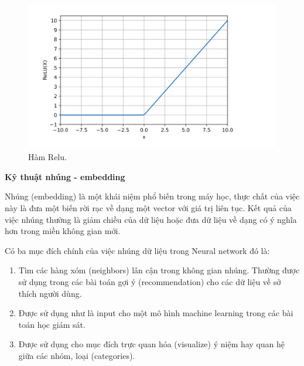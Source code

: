 \begin{itemize}
          \begin{figure}[t]
              \begin{center}
                  \includegraphics[scale=0.2]{asset/image/relu.png}
                  \caption{Hàm Relu. }
                  \label{fig:relu}
              \end{center}
          \end{figure}


\end{itemize}

\textbf{Kỹ thuật nhúng -  embedding}

Nhúng (embedding) là một khái niệm phổ biến trong máy học, thực chất của việc này là đưa một biến rời rạc về dạng một vector với giá trị liên tục. Kết quả của việc nhúng thường là giảm chiều của dữ liệu hoặc đưa dữ liệu về dạng có ý nghĩa hơn trong miền không gian mới.


Có ba mục đích chính của việc nhúng dữ liệu trong Neural network đó là:
\begin{enumerate}
    \item Tìm các hàng xóm (neighbors) lân cận trong không gian nhúng. Thường được sử dụng trong các bài toán gợi ý (recommendation) cho các dữ liệu về sở thích người dùng.
    \item Được sử dụng như là input cho một mô hình machine learning trong các bài toán học giám sát.
    \item Được sử dụng cho mục đích trực quan hóa (visualize) ý niệm hay quan hệ giữa các nhóm, loại (categories).
\end{enumerate}

